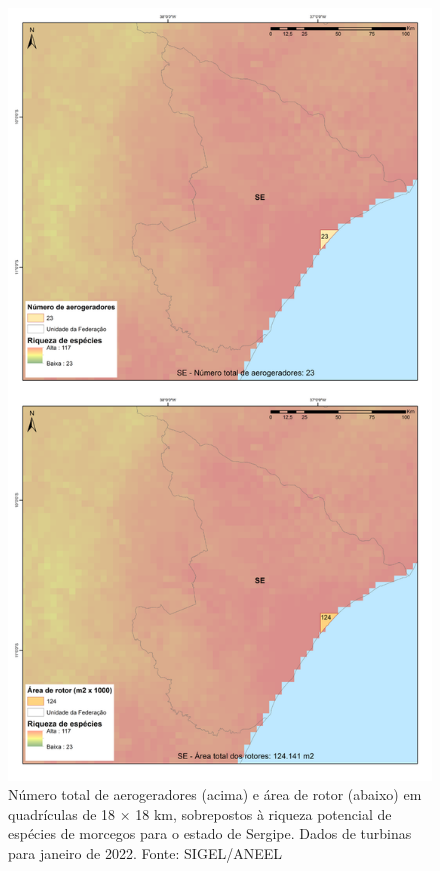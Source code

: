 \documentclass[
  oneside]{scrbook}
\begin{document}
\begin{figure}[H]

{\centering \includegraphics[width=0.7\linewidth]{imagens/cap09/Figura_9.11} 

}

\caption{Número total de aerogeradores (acima) e área de rotor (abaixo) em quadrículas de 18 × 18 km, sobrepostos à riqueza potencial de espécies de morcegos para o estado de Sergipe. Dados de turbinas para janeiro de 2022. Fonte: SIGEL/ANEEL}\label{fig:76}
\end{figure}
\end{document}
